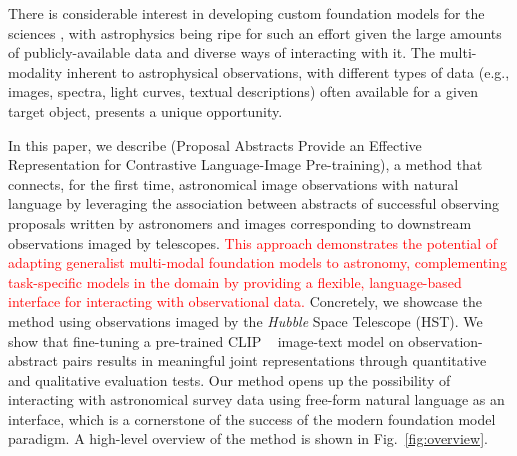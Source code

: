 \documentclass{article} %
\newcommand{\hubble}{\emph{Hubble}\xspace}
\newcommand{\changes}[1]{\textcolor{red}{#1}}
\begin{document}
There is considerable interest in developing custom foundation models for the sciences \citep[e.g., ][]{batatia2023foundation,subramanian2023towards,mccabe2023multiple,Birk:2024knn,vig2024finetuning,heinrich2024masked}, with astrophysics being ripe for such an effort given the large amounts of publicly-available data and diverse ways of interacting with it.
%
The multi-modality inherent to astrophysical observations, with different types of data (e.g., images, spectra, light curves, textual descriptions) often available for a given target object, presents a unique opportunity.
%

In this paper, we describe  (Proposal Abstracts Provide an Effective Representation for Contrastive Language-Image Pre-training),
a method that connects, for the first time, astronomical image observations with natural language by leveraging the association between abstracts of successful observing proposals written by astronomers and images corresponding to downstream observations imaged by telescopes. 
%
\changes{This approach demonstrates the potential of adapting generalist multi-modal foundation models to astronomy, complementing task-specific models in the domain by providing a flexible, language-based interface for interacting with observational data.}
%
Concretely, we showcase the method using observations imaged by the \hubble Space Telescope (HST).
%
We show that fine-tuning a pre-trained CLIP ~\citep[Contrastive Language-Image Pre-training; ][]{radford2021learning} image-text model on observation-abstract pairs results in meaningful joint representations through quantitative and qualitative evaluation tests.
%
Our method opens up the possibility of interacting with astronomical survey data using free-form natural language as an interface, which is a cornerstone of the success of the modern foundation model paradigm. A high-level overview of the method is shown in Fig.~\ref{fig:overview}.
%
\end{document}
